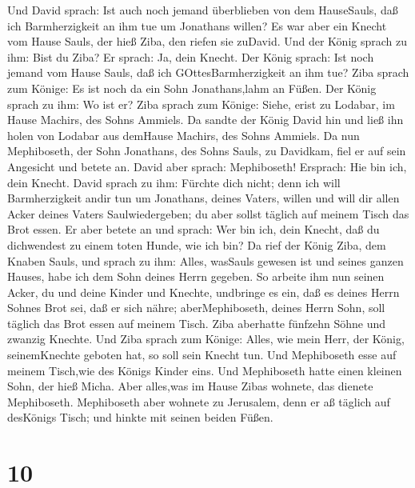  Und David sprach: Ist auch noch jemand überblieben von dem
HauseSauls, daß ich Barmherzigkeit an ihm tue um Jonathans willen?
 Es war aber ein Knecht vom Hause Sauls, der hieß Ziba, den
riefen sie zuDavid. Und der König sprach zu ihm: Bist du Ziba? Er
sprach: Ja, dein Knecht.  Der König sprach: Ist noch jemand
vom Hause Sauls, daß ich GOttesBarmherzigkeit an ihm tue? Ziba sprach
zum Könige: Es ist noch da ein Sohn Jonathans,lahm an Füßen.
 Der König sprach zu ihm: Wo ist er? Ziba sprach zum Könige:
Siehe, erist zu Lodabar, im Hause Machirs, des Sohns Ammiels.
 Da sandte der König David hin und ließ ihn holen von
Lodabar aus demHause Machirs, des Sohns Ammiels.  Da nun
Mephiboseth, der Sohn Jonathans, des Sohns Sauls, zu Davidkam, fiel er
auf sein Angesicht und betete an. David aber sprach: Mephiboseth!
Ersprach: Hie bin ich, dein Knecht.  David sprach zu ihm:
Fürchte dich nicht; denn ich will Barmherzigkeit andir tun um Jonathans,
deines Vaters, willen und will dir allen Acker deines Vaters
Saulwiedergeben; du aber sollst täglich auf meinem Tisch das Brot essen.
 Er aber betete an und sprach: Wer bin ich, dein Knecht, daß
du dichwendest zu einem toten Hunde, wie ich bin?  Da rief
der König Ziba, dem Knaben Sauls, und sprach zu ihm: Alles, wasSauls
gewesen ist und seines ganzen Hauses, habe ich dem Sohn deines Herrn
gegeben.  So arbeite ihm nun seinen Acker, du und deine
Kinder und Knechte, undbringe es ein, daß es deines Herrn Sohnes Brot
sei, daß er sich nähre; aberMephiboseth, deines Herrn Sohn, soll täglich
das Brot essen auf meinem Tisch. Ziba aberhatte fünfzehn Söhne und
zwanzig Knechte.  Und Ziba sprach zum Könige: Alles, wie
mein Herr, der König, seinemKnechte geboten hat, so soll sein Knecht
tun. Und Mephiboseth esse auf meinem Tisch,wie des Königs Kinder eins.
 Und Mephiboseth hatte einen kleinen Sohn, der hieß Micha.
Aber alles,was im Hause Zibas wohnete, das dienete Mephiboseth.
 Mephiboseth aber wohnete zu Jerusalem, denn er aß täglich
auf desKönigs Tisch; und hinkte mit seinen beiden Füßen.

\hypertarget{section-9}{%
\section{10}\label{section-9}}

